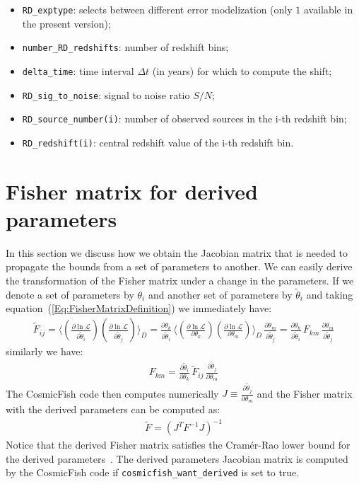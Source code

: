 \documentclass[prd,nofootinbib,showpacs]{revtex4}
\newcommand{\code}[1]{\lstinline|#1|}
\begin{document}
\begin{itemize}
\item \code{RD_exptype}: selects between different error modelization (only $1$ available in the present version);
\item \code{number_RD_redshifts}: number of redshift bins;
\item \code{delta_time}: time interval $\Delta t$ (in years) for which to compute the shift;
\item \code{RD_sig_to_noise}: signal to noise ratio $S/N$;
\item \code{RD_source_number(i)}: number of observed sources in the i-th redshift bin;
\item \code{RD_redshift(i)}: central redshift value of the i-th redshift bin.
\end{itemize}


%
\section{Fisher matrix for derived parameters}
%
In this section we discuss how we obtain the Jacobian matrix that is needed to propagate the bounds from a set of parameters to another.
We can easily derive the transformation of the Fisher matrix under a change in the parameters. If we denote a set of parameters by $\theta_i$ and another set of parameters by $\tilde{\theta}_i$ and taking equation~(\ref{Eq:FisherMatrixDefinition}) we immediately have:
%
\begin{align}
\tilde{F}_{ij} = \bigg\langle \left( \frac{\partial \ln \mathcal{L} }{\partial \tilde{\theta}_i}\right) \left( \frac{\partial \ln \mathcal{L} }{\partial \tilde{\theta}_j}\right) \bigg\rangle_{D} = \frac{\partial \theta_k}{\partial \tilde{\theta}_i}\,  \bigg\langle \left( \frac{\partial \ln \mathcal{L} }{\partial \theta_k}\right) \left( \frac{\partial \ln \mathcal{L} }{\partial \theta_m}\right)  \bigg\rangle_{D}\, \frac{\partial \theta_m}{\partial \tilde{\theta}_j} = \frac{\partial \theta_k}{\partial \tilde{\theta}_i}\, F_{km} \, \frac{\partial \theta_m}{\partial \tilde{\theta}_j}
\end{align}
%
similarly we have:
%
\begin{align} \label{Eq:FisherDerivedInverse}
F_{km} =  \frac{\partial \tilde{\theta}_i}{\partial \theta_k}\, \tilde{F}_{ij} \, \frac{\partial \tilde{\theta}_j}{\partial \theta_m} 
\end{align}
%
The CosmicFish code then computes numerically $J \equiv \frac{\partial \tilde{\theta}_j}{\partial \theta_m}$ and the Fisher matrix with the derived parameters can be computed as:
%
\begin{align}
\tilde{F} = \left( J^T F^{-1} J \right)^{-1}
\end{align}
%
Notice that the derived Fisher matrix satisfies the Cram\'er-Rao lower bound for the derived parameters~\cite{KayStat}.
The derived parameters Jacobian matrix is computed by the CosmicFish code if \code{cosmicfish_want_derived} is set to true.
%
\end{document}
